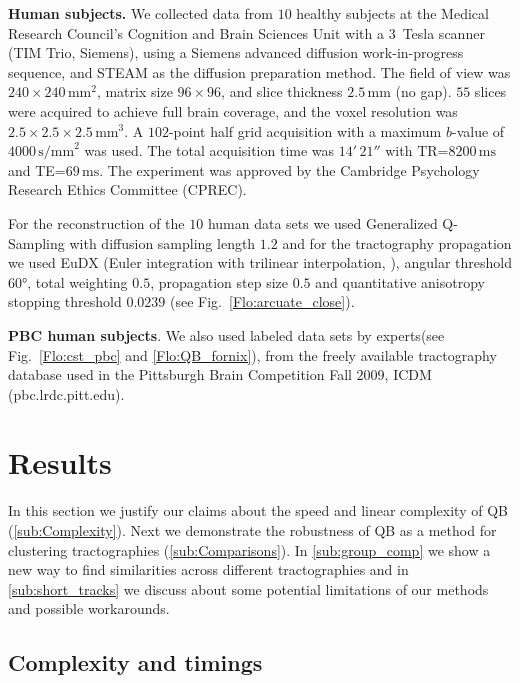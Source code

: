 \documentclass{bioinfo}
\begin{document}
\begin{methods}
\textbf{Human subjects.} We collected data from $10$ healthy subjects at
the Medical Research Council's Cognition and Brain Sciences Unit with a
3~Tesla scanner (TIM Trio, Siemens), using a Siemens advanced diffusion
work-in-progress sequence, and STEAM \citep{merboldt1992diffusion,MAB04}
as the diffusion preparation method. The field of view was
$240\times240\,\textrm{mm}^{2}$, matrix size $96\times96$, and slice
thickness $2.5\,\textrm{mm}$ (no gap).  $55$ slices were acquired to
achieve full brain coverage, and the voxel resolution was
$2.5\times2.5\times2.5\,\textrm{mm}^{3}$. A $102$-point half grid
acquisition \citep{Yeh2010} with a maximum $b$-value of $4000\,
\textrm{s/mm}^{2}$ was used.  The total acquisition time was $14'\,21''$
with TR=$8200\,\textrm{ms}$ and TE=$69\,\textrm{ms}$. The experiment was
approved by the Cambridge Psychology Research Ethics Committee (CPREC).

For the reconstruction of the $10$ human data sets we used Generalized
Q-Sampling \citep{Yeh2010} with diffusion sampling length $1.2$ and for
the tractography propagation we used EuDX (Euler integration with
trilinear interpolation, \citet{Garyfallidis_thesis}), angular threshold
\ang{60}, total weighting $0.5$, propagation step size $0.5$ and
quantitative anisotropy stopping threshold $0.0239$ (see
Fig.~\ref{Flo:arcuate_close}).

\textbf{PBC human subjects}. We also used labeled data sets by
experts(see Fig.~\ref{Flo:cst_pbc} and \ref{Flo:QB_fornix}), from the
freely available tractography database used in the Pittsburgh Brain
Competition Fall $2009$, ICDM (pbc.lrdc.pitt.edu).

\end{methods}

\section{Results}

In this section we justify our claims about the speed and linear
complexity of QB (\ref{sub:Complexity}). Next we demonstrate the
robustness of QB as a method for clustering tractographies
(\ref{sub:Comparisons}). In \ref{sub:group_comp} we show a new way to
find similarities across different tractographies and
in \ref{sub:short_tracks} we discuss about some potential limitations
of our methods and possible workarounds.

\subsection{Complexity and timings\label{sub:Complexity}}
\end{document}
